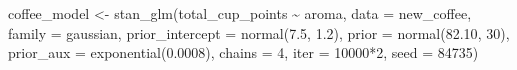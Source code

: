 \documentclass[
]{article}
\newenvironment{Shaded}{\begin{snugshade}}{\end{snugshade}}
\newcommand{\AttributeTok}[1]{\textcolor[rgb]{0.77,0.63,0.00}{#1}}
\newcommand{\DecValTok}[1]{\textcolor[rgb]{0.00,0.00,0.81}{#1}}
\newcommand{\FloatTok}[1]{\textcolor[rgb]{0.00,0.00,0.81}{#1}}
\newcommand{\FunctionTok}[1]{\textcolor[rgb]{0.00,0.00,0.00}{#1}}
\newcommand{\NormalTok}[1]{#1}
\newcommand{\OtherTok}[1]{\textcolor[rgb]{0.56,0.35,0.01}{#1}}
\newcommand{\SpecialCharTok}[1]{\textcolor[rgb]{0.00,0.00,0.00}{#1}}
\begin{document}
\begin{Shaded}
\begin{Highlighting}[]
\NormalTok{coffee\_model }\OtherTok{\textless{}{-}} \FunctionTok{stan\_glm}\NormalTok{(total\_cup\_points }\SpecialCharTok{\textasciitilde{}}\NormalTok{ aroma, }\AttributeTok{data =}\NormalTok{ new\_coffee,}
                       \AttributeTok{family =}\NormalTok{ gaussian,}
                       \AttributeTok{prior\_intercept =} \FunctionTok{normal}\NormalTok{(}\FloatTok{7.5}\NormalTok{, }\FloatTok{1.2}\NormalTok{),}
                       \AttributeTok{prior =} \FunctionTok{normal}\NormalTok{(}\FloatTok{82.10}\NormalTok{, }\DecValTok{30}\NormalTok{), }
                       \AttributeTok{prior\_aux =} \FunctionTok{exponential}\NormalTok{(}\FloatTok{0.0008}\NormalTok{),}
                       \AttributeTok{chains =} \DecValTok{4}\NormalTok{, }\AttributeTok{iter =} \DecValTok{10000}\SpecialCharTok{*}\DecValTok{2}\NormalTok{, }\AttributeTok{seed =} \DecValTok{84735}\NormalTok{)}
\end{Highlighting}
\end{Shaded}
\end{document}
